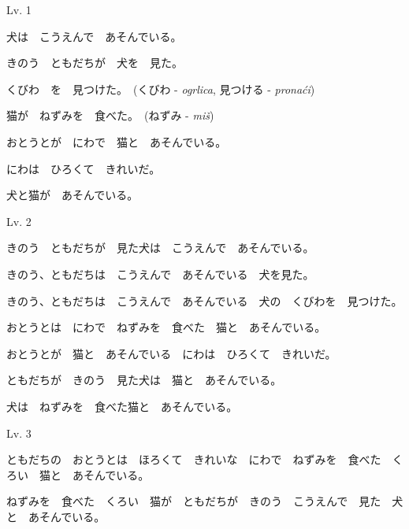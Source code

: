 
\author{Tomislav Mamić}

	
	\begin{mondai}{Lv. 1}
		\item 犬は　こうえんで　あそんでいる。
		\item きのう　ともだちが　犬を　見た。
		\item くびわ　を　見つけた。　(くびわ - \textit{ogrlica}, 見つける - \textit{pronaći})
		\item 猫が　ねずみを　食べた。　(ねずみ - \textit{miš})
		\item おとうとが　にわで　猫と　あそんでいる。
		\item にわは　ひろくて　きれいだ。
		\item 犬と猫が　あそんでいる。
	\end{mondai}

	\begin{mondai}{Lv. 2}
		\item きのう　ともだちが　見た犬は　こうえんで　あそんでいる。
		\item きのう、ともだちは　こうえんで　あそんでいる　犬を見た。
		\item きのう、ともだちは　こうえんで　あそんでいる　犬の　くびわを　見つけた。
		\item おとうとは　にわで　ねずみを　食べた　猫と　あそんでいる。
		\item おとうとが　猫と　あそんでいる　にわは　ひろくて　きれいだ。
		\item ともだちが　きのう　見た犬は　猫と　あそんでいる。
		\item 犬は　ねずみを　食べた猫と　あそんでいる。
	\end{mondai}

	\begin{mondai}{Lv. 3}
		\item ともだちの　おとうとは　ほろくて　きれいな　にわで　ねずみを　食べた　くろい　猫と　あそんでいる。
		\item ねずみを　食べた　くろい　猫が　ともだちが　きのう　こうえんで　見た　犬と　あそんでいる。
	\end{mondai}

